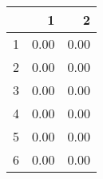 \begin{table}[ht]
\begin{center}
\begin{tabular}{rrr}
  \hline
 & 1 & 2 \\ 
  \hline
1 & 0.00 & 0.00 \\ 
  2 & 0.00 & 0.00 \\ 
  3 & 0.00 & 0.00 \\ 
  4 & 0.00 & 0.00 \\ 
  5 & 0.00 & 0.00 \\ 
  6 & 0.00 & 0.00 \\ 
   \hline
\end{tabular}
\end{center}
\end{table}
